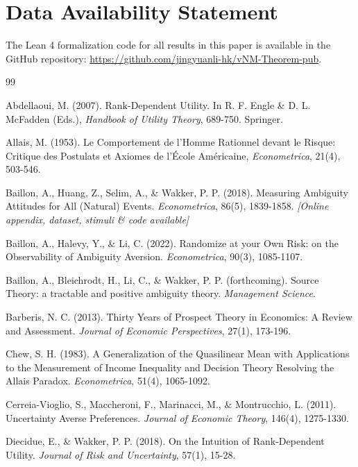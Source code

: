 \documentclass{article}
\theoremstyle{definition}
\begin{document}
\section*{Data Availability Statement}
The Lean 4 formalization code for all results in this paper is available in the GitHub repository: \url{https://github.com/jingyuanli-hk/vNM-Theorem-pub}.

\newpage
\begin{thebibliography}{99}

 Abdellaoui, M. (2007). Rank-Dependent Utility. In R. F. Engle \& D. L. McFadden (Eds.), \textit{Handbook of Utility Theory}, 689-750. Springer.

 Allais, M. (1953). Le Comportement de l'Homme Rationnel devant le Risque: Critique des Postulats et Axiomes de l'École Américaine, \textit{Econometrica}, 21(4), 503-546.

 Baillon, A., Huang, Z., Selim, A., \& Wakker, P. P. (2018). Measuring Ambiguity Attitudes for All (Natural) Events. \textit{Econometrica}, 86(5), 1839-1858. \textit{[Online appendix, dataset, stimuli \& code available]}

 Baillon, A., Halevy, Y., \& Li, C. (2022). Randomize at your Own Risk: on the Observability of Ambiguity Aversion. \textit{Econometrica}, 90(3), 1085-1107.

 Baillon, A., Bleichrodt, H., Li, C., \& Wakker, P. P. (forthcoming). Source Theory: a tractable and positive ambiguity theory. \textit{Management Science}.

 Barberis, N. C. (2013). Thirty Years of Prospect Theory in Economics: A Review and Assessment. \textit{Journal of Economic Perspectives}, 27(1), 173-196.

 Chew, S. H. (1983). A Generalization of the Quasilinear Mean with Applications to the Measurement of Income Inequality and Decision Theory Resolving the Allais Paradox. \textit{Econometrica}, 51(4), 1065-1092.

 Cerreia-Vioglio, S., Maccheroni, F., Marinacci, M., \& Montrucchio, L. (2011). Uncertainty Averse Preferences. \textit{Journal of Economic Theory}, 146(4), 1275-1330.


 Diecidue, E., \& Wakker, P. P. (2018). On the Intuition of Rank-Dependent Utility. \textit{Journal of Risk and Uncertainty}, 57(1), 15-28.


\end{thebibliography}
\end{document}
